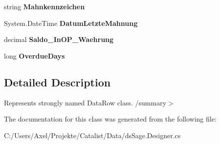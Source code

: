 \begin{DoxyCompactItemize}
\item 
string {\bfseries Mahnkennzeichen}\hypertarget{class_products_1_1_data_1_1ds_sage_1_1_op_debitoren_row_a9fe39e56762a21ac0873d0d9f34a8372}{}\label{class_products_1_1_data_1_1ds_sage_1_1_op_debitoren_row_a9fe39e56762a21ac0873d0d9f34a8372}

\item 
System.\+Date\+Time {\bfseries Datum\+Letzte\+Mahnung}\hypertarget{class_products_1_1_data_1_1ds_sage_1_1_op_debitoren_row_ae69bf4f3c7ddd49d23dd77ec1f86d01a}{}\label{class_products_1_1_data_1_1ds_sage_1_1_op_debitoren_row_ae69bf4f3c7ddd49d23dd77ec1f86d01a}

\item 
decimal {\bfseries Saldo\+\_\+\+In\+O\+P\+\_\+\+Waehrung}\hypertarget{class_products_1_1_data_1_1ds_sage_1_1_op_debitoren_row_aec0585b7b2989fa01c1facecd530dcb1}{}\label{class_products_1_1_data_1_1ds_sage_1_1_op_debitoren_row_aec0585b7b2989fa01c1facecd530dcb1}

\item 
long {\bfseries Overdue\+Days}\hypertarget{class_products_1_1_data_1_1ds_sage_1_1_op_debitoren_row_a135ed4ba9491893f7df5b833da5666dd}{}\label{class_products_1_1_data_1_1ds_sage_1_1_op_debitoren_row_a135ed4ba9491893f7df5b833da5666dd}

\end{DoxyCompactItemize}


\subsection{Detailed Description}
Represents strongly named Data\+Row class. /summary$>$ 

The documentation for this class was generated from the following file\+:\begin{DoxyCompactItemize}
\item 
C\+:/\+Users/\+Axel/\+Projekte/\+Catalist/\+Data/ds\+Sage.\+Designer.\+cs\end{DoxyCompactItemize}
